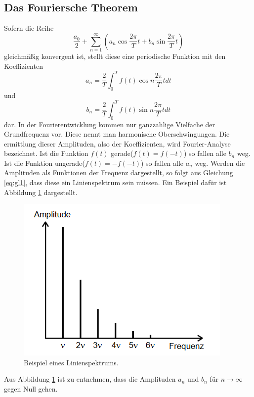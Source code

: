 \subsection{Das Fouriersche Theorem}
Sofern die Reihe
\begin{equation}
  \label{eq:gl1}
  \frac{a_0}{2}+\sum_{n=1}^\infty{(a_n\cos{\frac{2\pi}{T}t}+b_n\sin{\frac{2\pi}{T}t})}
\end{equation}
gleichmäßig konvergent ist, stellt diese eine periodische Funktion mit den Koeffizienten
\begin{equation}
  a_n=\frac{2}{T}\int_0^T f(t)\cos{n\frac{2\pi}{T}t}dt
\end{equation}
und
\begin{equation}
  b_n=\frac{2}{T}\int_0^T f(t)\sin{n\frac{2\pi}{T}t}dt
\end{equation}
dar.
In der Fourierentwicklung kommen nur ganzzahlige Vielfache der Grundfrequenz vor.
Diese nennt man harmonische Oberschwingungen.
Die ermittlung dieser Amplituden, also der Koeffizienten, wird Fourier-Analyse bezeichnet.
Ist die Funktion $f(t)$ gerade($f(t)=f(-t)$) so fallen alle $b_n$ weg.
Ist die Funktion ungerade($f(t)=-f(-t)$) so fallen alle $a_n$ weg.
Werden die Amplituden als Funktionen der Frequenz dargestellt, so folgt aus Gleichung \eqref{eq:gl1}, dass diese ein Linienspektrum sein müssen.
Ein Beispiel dafür ist Abbildung \ref{fig:lspek} dargestellt.
\begin{figure}[H]
    \centering
    \caption{Beispiel eines Linienspektrums.}%
    \label{fig:lspek}
    \includegraphics[width=\textwidth-20em]{content/lspek.png}
\end{figure}
\noindent
Aus Abbildung \ref{fig:lspek} ist zu entnehmen, dass die Amplituden $a_n$ und $b_n$ für $n\rightarrow\infty$ gegen Null gehen.


